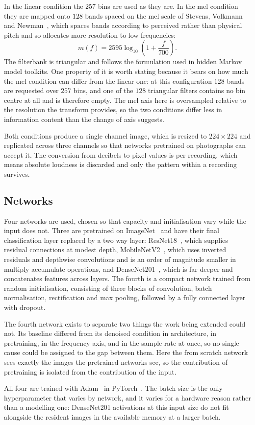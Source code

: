 In the linear condition the $257$ bins are used as they are. In the mel condition they are
mapped onto $128$ bands spaced on the mel scale of Stevens, Volkmann and
Newman~\cite{stevens1937}, which spaces bands according to perceived rather than physical
pitch and so allocates more resolution to low frequencies:
\begin{equation}
m(f) = 2595 \log_{10}\!\left(1 + \frac{f}{700}\right).
\label{eq:mel}
\end{equation}
The filterbank is triangular and follows the formulation used in hidden Markov model
toolkits. One property of it is worth stating because it bears on how much the mel
condition can differ from the linear one: at this configuration $128$ bands are requested
over $257$ bins, and one of the $128$ triangular filters contains no bin centre at all and
is therefore empty. The mel axis here is oversampled relative to the resolution the
transform provides, so the two conditions differ less in information content than the
change of axis suggests.

Both conditions produce a single channel image, which is resized to $224 \times 224$ and
replicated across three channels so that networks pretrained on photographs can accept
it. The conversion from decibels to pixel values is per recording, which means absolute
loudness is discarded and only the pattern within a recording survives.

\subsection{Networks}\label{sec:design-nets}

Four networks are used, chosen so that capacity and initialisation vary while the input
does not. Three are pretrained on ImageNet~\cite{russakovsky2015} and have their final
classification layer replaced by a two way layer: ResNet18~\cite{he2016}, which supplies
residual connections at modest depth, MobileNetV2~\cite{sandler2018}, which uses inverted
residuals and depthwise convolutions and is an order of magnitude smaller in multiply
accumulate operations, and DenseNet201~\cite{huang2017}, which is far deeper and
concatenates features across layers. The fourth is a compact network trained from random
initialisation, consisting of three blocks of convolution, batch normalisation,
rectification and max pooling, followed by a fully connected layer with dropout.

The fourth network exists to separate two things the work being extended could not. Its
baseline differed from its denoised condition in architecture, in pretraining, in the
frequency axis, and in the sample rate at once, so no single cause could be assigned to
the gap between them. Here the from scratch network sees exactly the images the
pretrained networks see, so the contribution of pretraining is isolated from the
contribution of the input.

All four are trained with Adam~\cite{kingma2015} in PyTorch~\cite{paszke2019}. The batch
size is the only hyperparameter that varies by network, and it varies for a hardware
reason rather than a modelling one: DenseNet201 activations at this input size do not fit
alongside the resident images in the available memory at a larger batch.
